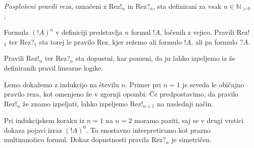\begin{definicija}
    \emph{Posplošeni pravili reza}, označeni z Rez!$_n$ in Rez?$_{n}$, sta definirani za vsak $n\in\mathbb{N}_{>0}$;
    \begin{prooftree}
    \end{prooftree}
    \begin{prooftree}
    \end{prooftree}
\end{definicija}

\begin{opomba}
    Formula $(!A)^n$ v definiciji predstavlja $n$ formul $!A$, ločenih z vejico. Pravili Rez!$_{1}$ ter Rez?$_{1}$ sta torej le pravilo Rez, kjer režemo ali formulo $!A$, ali pa formulo $?A$.
\end{opomba}

\begin{lema}
    Pravili Rez!$_n$ ter Rez?$_{n}$ sta dopustni, kar pomeni, da ju lahko izpeljemo iz že definiranih pravil linearne logike.
\end{lema}

\begin{dokaz}
    Lemo dokažemo z indukcijo na številu $n$. Primer pri $n=1$ je seveda le običajno pravilo reza, kot omenjeno že v zgornji opombi. Če predpostavimo, da pravilo Rez!$_n$ že znamo izpeljati, lahko izpeljemo Rez!$_{n+1}$ na naslednji način.
    \begin{prooftree}

    \end{prooftree}
    Pri indukcijskem koraku iz $n=1$ na $n=2$ moramo paziti, saj se v drugi vrstici dokaza pojavi izraz $(!A)^0$. To enostavno interpretiramo kot prazno multimnožico formul. Dokaz dopustnosti pravila Rez?$_{n}$ je simetričen.
\end{dokaz}


